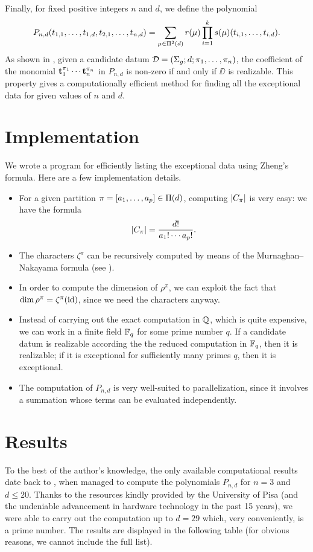Finally, for fixed positive integers $n$ and $d$, we define the polynomial
\[
P_{n,d}(t_{1,1},\ldots,t_{1,d},t_{2,1},\ldots,t_{n,d})=\sum_{\mu\in\SPartitions{d}}r(\mu)\prod_{i=1}^ks(\mu)(t_{i,1},\ldots,t_{i,d}).
\]
As shown in \cite{zheng}, given a candidate datum $\DD=\datum{\surf{g}}{d}{\pi_1,\ldots,\pi_n}$, the coefficient of the monomial $\tt_1^{\pi_1}\cdots\tt_n^{\pi_n}$ in $P_{n,d}$ is non-zero if and only if $\DD$ is realizable. This property gives a computationally efficient method for finding all the exceptional data for given values of $n$ and $d$.

\section{Implementation}\label{computational-results:sc:implementation}
We wrote a \Cpp{} program for efficiently listing the exceptional data using Zheng's formula. Here are a few implementation details.
\begin{itemize}
\item For a given partition $\pi=[a_1,\ldots,a_p]\in\Partitions{d}$, computing $\card{C_\pi}$ is very easy: we have the formula
\[
\card{C_\pi}=\frac{d!}{a_1!\cdots a_p!}.
\]
\item The characters $\zeta^\pi$ can be recursively computed by means of the Murnaghan–Nakayama formula (see ).
\item In order to compute the dimension of $\rho^\pi$, we can exploit the fact that $\dim\rho^\pi=\zeta^\pi(\id)$, since we need the characters anyway.
\item Instead of carrying out the exact computation in $\QQ$, which is quite expensive, we can work in a finite field $\FF_q$ for some prime number $q$. If a candidate datum is realizable according the the reduced computation in $\FF_q$, then it is realizable; if it is exceptional for sufficiently many primes $q$, then it is exceptional.
\item The computation of $P_{n,d}$ is very well-suited to parallelization, since it involves a summation whose terms can be evaluated independently.
\end{itemize}

\section{Results}

To the best of the author's knowledge, the only available computational results date back to \citeyear{zheng}, when \citeauthor{zheng} managed to compute the polynomials $P_{n,d}$ for $n=3$ and $d\le 20$. Thanks to the resources kindly provided by the University of Pisa (and the undeniable advancement in hardware technology in the past 15 years), we were able to carry out the computation up to $d=29$ which, very conveniently, is a prime number. The results are displayed in the following table (for obvious reasons, we cannot include the full list).

